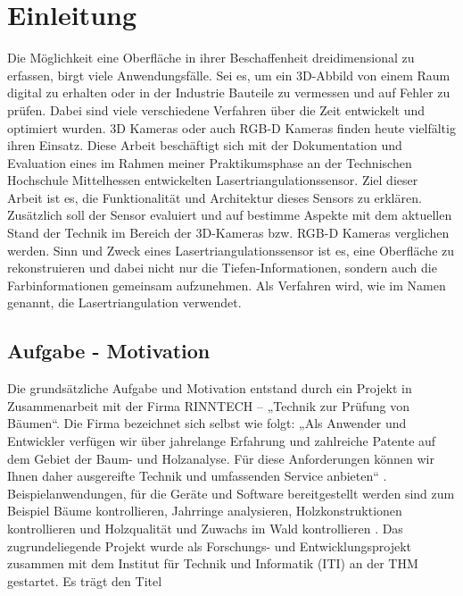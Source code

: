 \section{Einleitung}\label{einleitung}
Die Möglichkeit eine Oberfläche in ihrer Beschaffenheit dreidimensional zu erfassen, birgt viele Anwendungsfälle. Sei es, um ein 3D-Abbild von einem Raum digital zu erhalten oder in der Industrie Bauteile zu vermessen und auf Fehler zu prüfen. Dabei sind viele verschiedene Verfahren über die Zeit entwickelt und optimiert wurden. 3D Kameras oder auch RGB-D Kameras finden heute vielfältig ihren Einsatz. Diese Arbeit beschäftigt sich mit der Dokumentation und Evaluation eines im Rahmen meiner Praktikumsphase an der Technischen Hochschule Mittelhessen entwickelten Lasertriangulationssensor. Ziel dieser Arbeit ist es, die Funktionalität und Architektur dieses Sensors zu erklären. Zusätzlich soll der Sensor evaluiert und auf bestimme Aspekte mit dem aktuellen Stand der Technik im Bereich der 3D-Kameras bzw. RGB-D Kameras verglichen werden.
Sinn und Zweck eines Lasertriangulationssensor ist es, eine Oberfläche zu rekonstruieren und dabei nicht nur die Tiefen-Informationen, sondern auch die Farbinformationen gemeinsam aufzunehmen. Als Verfahren wird, wie im Namen genannt, die Lasertriangulation verwendet.

	\subsection{Aufgabe - Motivation}
	Die grundsätzliche Aufgabe und Motivation entstand durch ein Projekt in Zusammenarbeit mit der Firma RINNTECH – „Technik zur Prüfung von Bäumen“. Die Firma bezeichnet sich selbst wie folgt: „Als Anwender und Entwickler verfügen wir über jahrelange Erfahrung und zahlreiche Patente auf dem Gebiet der Baum- und Holzanalyse. Für diese Anforderungen können wir Ihnen daher ausgereifte Technik und umfassenden Service anbieten“ \citep[vgl.][]{noauthor_rinntech_nodate}. Beispielanwendungen, für die Geräte und Software bereitgestellt werden sind zum Beispiel Bäume kontrollieren, Jahrringe analysieren, Holzkonstruktionen kontrollieren und Holzqualität und Zuwachs im Wald kontrollieren \citep[vgl.][]{noauthor_rinntech_nodate}. Das zugrundeliegende Projekt wurde als Forschungs- und Entwicklungsprojekt zusammen mit dem Institut für Technik und Informatik (ITI) an der THM gestartet. Es trägt den Titel
	
